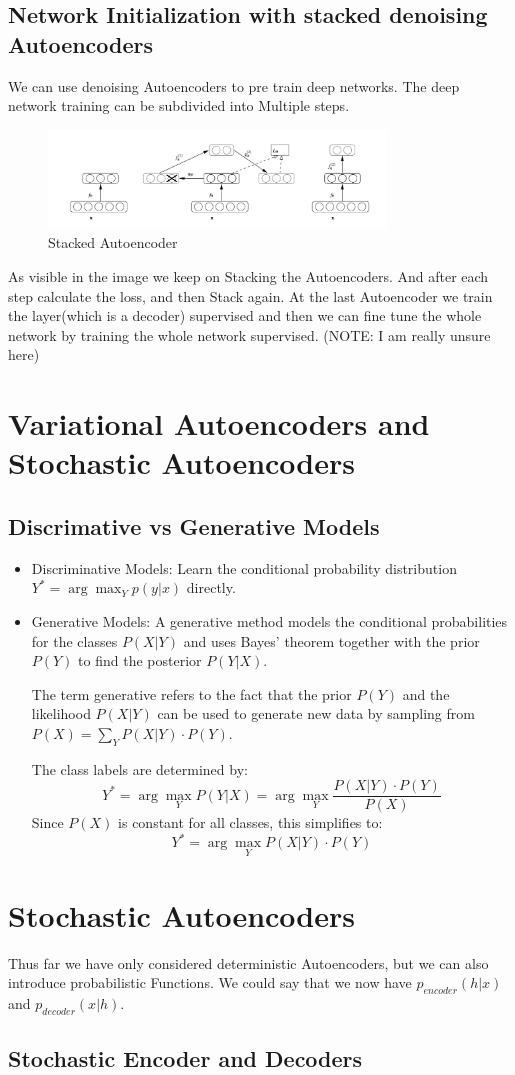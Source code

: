 \documentclass[a4paper]{article}
\begin{document}
\subsection{Network Initialization with stacked denoising Autoencoders}
We can use denoising Autoencoders to pre train deep networks. The deep network training can be subdivided into Multiple steps. 
\begin{figure}[h]
    \centering
    \includegraphics[width=0.8\textwidth]{images/stacked_autoencoders.png}
    \caption{Stacked Autoencoder}
    \label{fig:Stacked Autoencoder}
\end{figure}

As visible in the image we keep on Stacking the Autoencoders. And after each step calculate the loss, and then Stack again. 
At the last Autoencoder we train the layer(which is a decoder) supervised and then we can fine tune the whole network by training the whole network supervised. (NOTE: I am really unsure here)
\section{Variational Autoencoders and Stochastic Autoencoders}
\subsection{Discrimative vs Generative Models}
\begin{itemize}
    \item Discriminative Models: Learn the conditional probability distribution \(Y^{*} = \arg \max_{Y} p(y|x) \) directly.
    \item Generative Models: A generative method models the conditional probabilities for the classes \( P(X|Y) \) and uses Bayes' theorem together with the prior \( P(Y) \) to find the posterior \( P(Y|X) \).

    The term generative refers to the fact that the prior \( P(Y) \) and the likelihood \( P(X|Y) \) can be used to generate new data by sampling from \( P(X) = \sum_Y P(X|Y) \cdot P(Y) \).
    
    The class labels are determined by:
    \[
    Y^* = \arg\max_Y P(Y|X) = \arg\max_Y \frac{P(X|Y) \cdot P(Y)}{P(X)}
    \]
    Since \( P(X) \) is constant for all classes, this simplifies to:
    \[
    Y^* = \arg\max_Y P(X|Y) \cdot P(Y)
    \]
\end{itemize}

\section{Stochastic Autoencoders}
Thus far we have only considered deterministic Autoencoders, but we can also introduce probabilistic Functions. We could say that we now have $p_{encoder}(h|x)$  and $p_{decoder}(x|h)$. 

\subsection{Stochastic Encoder and Decoders}    
\end{document}
